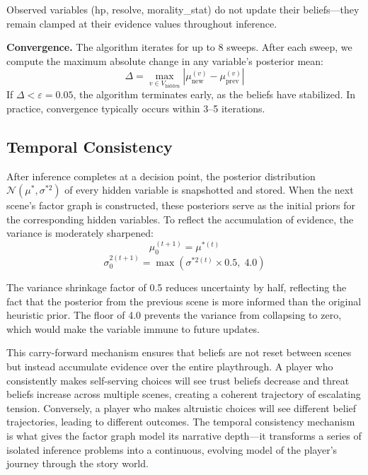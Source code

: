 \documentclass[journal]{IEEEtran}
\begin{document}
Observed variables (hp, resolve, morality\_stat) do not update their beliefs---they remain clamped at their evidence values throughout inference.

\textbf{Convergence.} The algorithm iterates for up to 8 sweeps. After each sweep, we compute the maximum absolute change in any variable's posterior mean:
\begin{equation}
\Delta = \max_{v \in V_{\text{hidden}}} |\mu_{\text{new}}^{(v)} - \mu_{\text{prev}}^{(v)}|
\end{equation}
If $\Delta < \varepsilon = 0.05$, the algorithm terminates early, as the beliefs have stabilized. In practice, convergence typically occurs within 3--5 iterations.

\subsection{Temporal Consistency}

After inference completes at a decision point, the posterior distribution $\mathcal{N}(\mu^*, \sigma^{*2})$ of every hidden variable is snapshotted and stored. When the next scene's factor graph is constructed, these posteriors serve as the initial priors for the corresponding hidden variables. To reflect the accumulation of evidence, the variance is moderately sharpened:
\begin{equation}
\mu_0^{(t+1)} = \mu^{*(t)}
\end{equation}
\begin{equation}
\sigma_0^{2(t+1)} = \max\!\left(\sigma^{*2(t)} \times 0.5,\; 4.0\right)
\end{equation}

The variance shrinkage factor of 0.5 reduces uncertainty by half, reflecting the fact that the posterior from the previous scene is more informed than the original heuristic prior. The floor of 4.0 prevents the variance from collapsing to zero, which would make the variable immune to future updates.

This carry-forward mechanism ensures that beliefs are not reset between scenes but instead accumulate evidence over the entire playthrough. A player who consistently makes self-serving choices will see trust beliefs decrease and threat beliefs increase across multiple scenes, creating a coherent trajectory of escalating tension. Conversely, a player who makes altruistic choices will see different belief trajectories, leading to different outcomes. The temporal consistency mechanism is what gives the factor graph model its narrative depth---it transforms a series of isolated inference problems into a continuous, evolving model of the player's journey through the story world.
\end{document}
